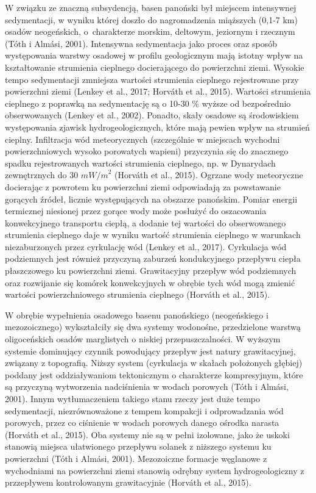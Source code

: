 \documentclass[11.5pt,twoside]{report}
\begin{document}
 W związku ze znaczną subsydencją, basen panoński był miejscem intensywnej sedymentacji, w wyniku której doszło do nagromadzenia miąższych (0,1-7 km) osadów neogeńskich, o~charakterze morskim, deltowym, jeziornym i rzecznym (T\'{o}th i Alm\'{a}si, 2001). Intensywna sedymentacja jako proces oraz sposób występowania warstwy osadowej w profilu geologicznym mają istotny wpływ na kształtowanie strumienia cieplnego docierającego do powierzchni ziemi. Wysokie tempo sedymentacji zmniejsza wartości strumienia cieplnego rejestrowane przy powierzchni ziemi (Lenkey et al., 2017; Horv\'{a}th et al., 2015). Wartości strumienia cieplnego z poprawką na sedymentację są o 10-30 \% wyższe od bezpośrednio obserwowanych (Lenkey et al., 2002). Ponadto, skały osadowe są środowiskiem występowania zjawisk hydrogeologicznych, które mają pewien wpływ na strumień cieplny. Infiltracja wód meteorycznych (szczególnie w miejscach wychodni powierzchniowych wysoko porowatych wapieni) przyczynia się do znacznego spadku rejestrowanych wartości strumienia cieplnego, np. w Dynarydach zewnętrznych do 30 ${mW/m}^{2}$ (Horv\'{a}th et al., 2015). Ogrzane wody meteoryczne docierając z powrotem ku powierzchni ziemi odpowiadają za powstawanie gorących \'{z}ródeł, licznie występujących na obszarze panońskim. Pomiar energii termicznej niesionej przez gorące wody może posłużyć do oszacowania konwekcyjnego transportu ciepłą, a dodanie tej wartości do obserwowanego strumienia cieplnego daje w wyniku wartość strumienia cieplnego w warunkach niezaburzonych przez cyrkulację wód (Lenkey et al., 2017). Cyrkulacja wód podziemnych jest również przyczyną zaburzeń kondukcyjnego przepływu ciepła płaszczowego ku powierzchni ziemi. Grawitacyjny przepływ wód podziemnych oraz rozwijanie się komórek konwekcyjnych w obrębie tych wód mogą zmienić wartości powierzchniowego strumienia cieplnego (Horv\'{a}th et al., 2015). 
 
 W obrębie wypełnienia osadowego basenu panońskiego (neogeńskiego i mezozoicznego) wykształciły się dwa systemy wodonośne, przedzielone warstwą oligoceńskich osadów marglistych o niskiej przepuszczalności. W wyższym systemie dominujący czynnik powodujący przepływ jest natury grawitacyjnej, związany z topografią. Niższy system (cyrkulacja w skałach położonych głębiej) poddany jest oddziaływaniom tektonicznym o charakterze kompresyjnym, które są przyczyną wytworzenia nadciśnienia w wodach porowych (T\'{o}th i Alm\'{a}si, 2001). Innym wytłumaczeniem takiego stanu rzeczy jest duże tempo sedymentacji, niezrównoważone z tempem kompakcji i odprowadzania wód porowych, przez co ciśnienie w wodach porowych danego ośrodka narasta (Horv\'{a}th et al., 2015). Oba systemy nie są w pełni izolowane, jako że uskoki stanowią miejsca ułatwionego przepływu solanek z niższego systemu ku powierzchni (T\'{o}th i Alm\'{a}si, 2001). Mezozoiczne formacje węglanowe z wychodniami na powierzchni ziemi stanowią odrębny system hydrogeologiczny z przzepływem kontrolowanym grawitacyjnie (Horv\'{a}th et al., 2015). 
 
\end{document}
